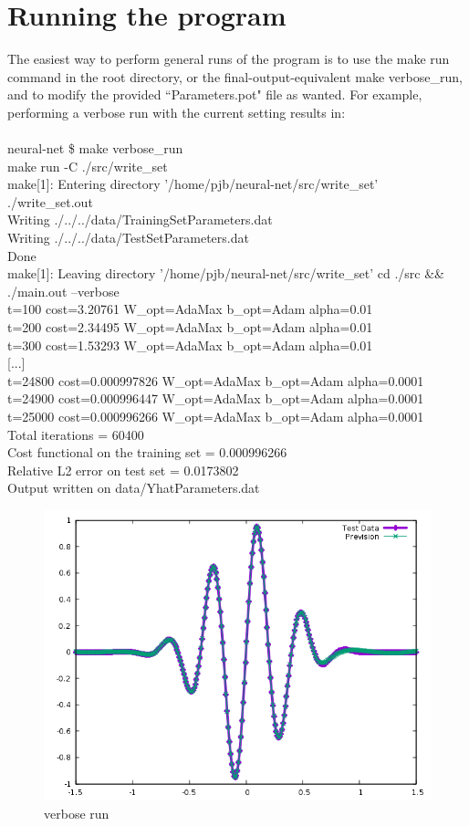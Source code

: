 \documentclass[12pt, a4paper]{report}
\theoremstyle{definition}
\begin{document}
\section{Running the program}\label{section4.3}
The easiest way to perform general runs of the program is to use the {\ttfamily make run} command in the root directory, or the final-output-equivalent {\ttfamily make verbose\_run}, and to modify the provided ``Parameters.pot" file as wanted. For example, performing a verbose run with the current setting results in:\\
{\\\ttfamily neural-net \$ make verbose\_run\\
	make run -C ./src/write\_set\\
	make[1]: Entering directory '/home/pjb/neural-net/src/write\_set'
	./write\_set.out\\
	Writing ./../../data/TrainingSetParameters.dat\\
	Writing ./../../data/TestSetParameters.dat\\
	Done\\
	make[1]: Leaving directory '/home/pjb/neural-net/src/write\_set'
	cd ./src \&\& ./main.out --verbose\\
	t=100 cost=3.20761 W\_opt=AdaMax b\_opt=Adam alpha=0.01\\
	t=200 cost=2.34495 W\_opt=AdaMax b\_opt=Adam alpha=0.01\\
	t=300 cost=1.53293 W\_opt=AdaMax b\_opt=Adam alpha=0.01\\
	{[...]}\\
	t=24800 cost=0.000997826 W\_opt=AdaMax b\_opt=Adam alpha=0.0001\\
	t=24900 cost=0.000996447 W\_opt=AdaMax b\_opt=Adam alpha=0.0001\\
	t=25000 cost=0.000996266 W\_opt=AdaMax b\_opt=Adam alpha=0.0001\\
	Total iterations = 60400\\
	Cost functional on the training set = 0.000996266\\
	Relative L2 error on test set = 0.0173802\\
	Output written on data/YhatParameters.dat\\
}
\begin{figure}[H]
	\centering
	\includegraphics[width=\textwidth]{img/VerboseRun} 
	\caption{verbose run}
\end{figure}
\end{document}
